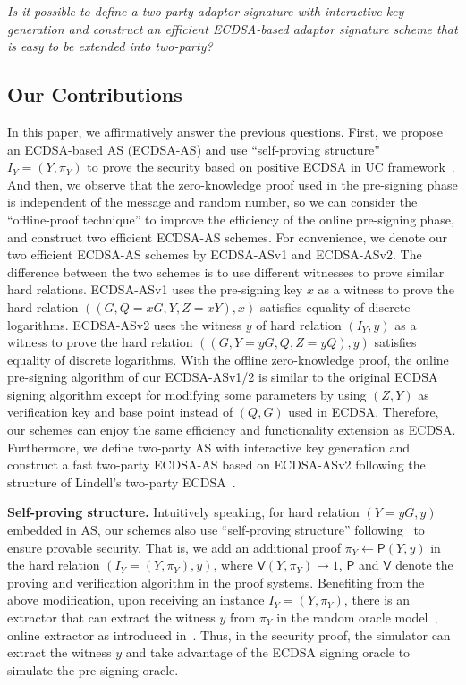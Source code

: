 \documentclass{llncs}
\begin{document}
\begin{minipage}{0.9\textwidth}
\centering
\emph{Is it possible to define a two-party adaptor signature with interactive key generation and construct an efficient ECDSA-based adaptor signature scheme that is easy to be extended into two-party?}
\end{minipage}


\subsection{Our Contributions}

In this paper, we affirmatively answer the previous questions. First, we propose an ECDSA-based AS (ECDSA-AS) and use ``self-proving structure''~\cite{AumayrEEFHMMR20} $I_Y=(Y, \pi_Y)$ to prove the security based on positive ECDSA in UC framework~\cite{Canetti01}. And then, we observe that the zero-knowledge proof used in the pre-signing phase is independent of the message and random number, so we can consider the ``offline-proof technique'' to improve the efficiency of the online pre-signing phase, and construct two efficient ECDSA-AS schemes. For convenience, we denote our two efficient ECDSA-AS schemes by ECDSA-ASv1 and ECDSA-ASv2. The difference between the two schemes is to use different witnesses to prove similar hard relations. ECDSA-ASv1 uses the pre-signing key $x$ as a witness to prove the hard relation $((G, Q=xG, Y, Z=xY), x)$ satisfies equality of discrete logarithms. ECDSA-ASv2 uses the witness $y$ of hard relation $(I_Y,y)$ as a witness to prove the hard relation $((G, Y=yG, Q, Z=yQ), y)$ satisfies equality of discrete logarithms. With the offline zero-knowledge proof, the online pre-signing algorithm of our ECDSA-ASv1/2 is similar to the original ECDSA signing algorithm except for modifying some parameters by using $(Z, Y)$ as verification key and base point instead of $(Q, G)$ used in ECDSA. Therefore, our schemes can enjoy the same efficiency and functionality extension as ECDSA. Furthermore, we define two-party AS with interactive key generation and construct a fast two-party ECDSA-AS based on ECDSA-ASv2 following the structure of Lindell's two-party ECDSA~\cite{Lin17}.

\begin{trivlist}
\item \textbf{Self-proving structure.} Intuitively speaking, for hard relation $(Y=yG,y)$ embedded in AS, our schemes also use ``self-proving structure'' following~\cite{AumayrEEFHMMR20} to ensure provable security. That is, we add an additional proof $\pi_Y\leftarrow \mathsf{P}(Y,y)$ in the hard relation $(I_Y=(Y, \pi_Y),y)$, where $\mathsf{V}(Y,\pi_Y)\rightarrow 1$, $\mathsf{P}$ and $\mathsf{V}$ denote the proving and verification algorithm in the proof systems. Benefiting from the above modification, upon receiving an instance $I_Y= (Y,\pi_Y)$, there is an extractor that can extract the witness $y$ from $\pi_Y$ in the random oracle model~\cite{AumayrEEFHMMR20}, online extractor as introduced in~\cite{Fischlin05}. Thus, in the security proof, the simulator can extract the witness $y$ and take advantage of the ECDSA signing oracle to simulate the pre-signing oracle. 
\end{trivlist}
\end{document}
